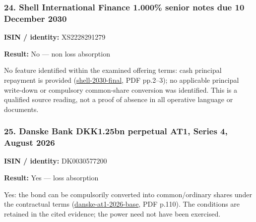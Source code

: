 \documentclass[
  11pt,
]{article}
\begin{document}
\begin{minipage}{\linewidth}

\hypertarget{shell-international-finance-1.000-senior-notes-due-10-december-2030}{%
\subsubsection{24. Shell International Finance 1.000\% senior notes due
10 December
2030}\label{shell-international-finance-1.000-senior-notes-due-10-december-2030}}

\textbf{ISIN / identity:} XS2228291279

\textbf{Result:} No --- non loss absorption

No feature identified within the examined offering terms: cash principal
repayment is provided
(\href{https://www.shell.com/investors/debt-information/euro-medium-term-note-programme/_jcr_content/root/main/section/list_copy_copy_copy_/list_item_copy_copy/links/item0.stream/1663917767502/47c8d7b3a405fab02d473afe58be2ef88202a1b7/final-terms-2030-notes.pdf}{shell-2030-final},
PDF pp.2--3); no applicable principal write-down or compulsory
common-share conversion was identified. This is a qualified source
reading, not a proof of absence in all operative language or documents.

\end{minipage}
\par\addvspace{1.1em}

\begin{minipage}{\linewidth}

\hypertarget{danske-bank-dkk1.25bn-perpetual-at1-series-4-august-2026}{%
\subsubsection{25. Danske Bank DKK1.25bn perpetual AT1, Series 4, August
2026}\label{danske-bank-dkk1.25bn-perpetual-at1-series-4-august-2026}}

\textbf{ISIN / identity:} DK0030577200

\textbf{Result:} Yes --- loss absorption

Yes: the bond can be compulsorily converted into common/ordinary shares
under the contractual terms
(\href{https://danskebank.com/-/media/danske-bank-com/pdf/investor-relations/debt/funding-programmes/ukeuaoshearman130005984308v1-danske-bank-at1-programme--base-offering-memorandum--1408.pdf?rev=0f570805930e40c8a2c13a7c619d4550\&hash=C3AA3276A5A0D08824B931BAB62C7271}{danske-at1-2026-base},
PDF p.110). The conditions are retained in the cited evidence; the power
need not have been exercised.

\end{minipage}
\par\addvspace{1.1em}
\end{document}
